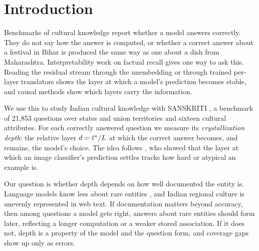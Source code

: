 \section{Introduction}

Benchmarks of cultural knowledge report whether a model answers correctly.
They do not say how the answer is computed, or whether a correct answer about a festival in Bihar is produced the same way as one about a dish from Maharashtra.
Interpretability work on factual recall gives one way to ask this.
Reading the residual stream through the unembedding \citep{nostalgebraist2020logitlens} or through trained per-layer translators \citep{belrose2023tuned} shows the layer at which a model's prediction becomes stable, and causal methods \citep{meng2022locating,geva-etal-2023-dissecting} show which layers carry the information.

We use this to study Indian cultural knowledge with SANSKRITI \citep{maji-etal-2025-sanskriti}, a benchmark of 21{,}853 questions over \nStates{} states and union territories and sixteen cultural attributes.
For each correctly answered question we measure its \emph{crystallization depth}: the relative layer $d = \ell^{*} / L$ at which the correct answer becomes, and remains, the model's choice.
The idea follows \citet{baldock2021difficulty}, who showed that the layer at which an image classifier's prediction settles tracks how hard or atypical an example is.

Our question is whether depth depends on how well documented the entity is.
Language models know less about rare entities \citep{kandpal2023longtail,mallen-etal-2023-trust}, and Indian regional culture is unevenly represented in web text.
If documentation matters beyond accuracy, then among questions a model gets right, answers about rare entities should form later, reflecting a longer computation or a weaker stored association.
If it does not, depth is a property of the model and the question form, and coverage gaps show up only as errors.

